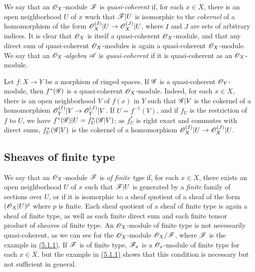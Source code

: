 \begin{env}[5.1.3]
\label{env-0.5.1.3}
We say that an $\mathscr{O}_X$-module $\mathscr{F}$ is {\em quasi-coherent} if, for each $x\in X$, there
is an open neighborhood $U$ of $x$ wuch that $\mathscr{F}|U$ is isomorphic to the {\em cokernel}
of a homomorphism of the form $\mathscr{O}_X^{(I)}|U\to\mathscr{O}_X^{(J)}|U$, where $I$ and $J$ are sets of
arbitrary indices. It is clear that $\mathscr{O}_X$ is itself a quasi-coherent $\mathscr{O}_X$-module, and
that any direct sum of quasi-coherent $\mathscr{O}_X$-modules is again a quasi-coherent
$\mathscr{O}_X$-module. We say that an {\em $\mathscr{O}_X$-algebra $\mathscr{A}$} is {\em quasi-coherent} if
it is quasi-coherent as an $\mathscr{O}_X$-module.
\end{env}

\begin{env}[5.1.4]
\label{env-0.5.1.4}
Let $f:X\to Y$ be a morphism of ringed spaces. If $\mathscr{G}$ is a quasi-coherent
$\mathscr{O}_Y$-module, then $f^*(\mathscr{G})$ is a quasi-coherent $\mathscr{O}_X$-module. Indeed, for each
$x\in X$, there is an open neighborhood $V$ of $f(x)$ in $Y$ such that $\mathscr{G}|V$ is the
cokernel of a homomorphism $\mathscr{O}_Y^{(I)}|V\to\mathscr{O}_Y^{(J)}|V$. If $U=f^{-1}(V)$, and if $f_U$ is
the restriction of $f$ to $U$, we have $f^*(\mathscr{G})|U=f_U^*(\mathscr{G}|V)$; as $f_U^*$ is right
exact and commutes with direct sums, $f_U^*(\mathscr{G}|V)$ is the cokernel of a homomorphism
$\mathscr{O}_X^{(I)}|U\to\mathscr{O}_X^{(J)}|U$.
\end{env}

\subsection{Sheaves of finite type}
\label{subsection-sheaves-of-finite-type}

\begin{env}[5.2.1]
\label{env-0.5.2.1}
We say that an $\mathscr{O}_X$-module $\mathscr{F}$ is {\em of finite type} if, for each $x\in X$, there
exists an open neighborhood $U$ of $x$ such that $\mathscr{F}|U$ is generated by a {\em finite}
family of sections over $U$, or if it is isomorphic to a sheaf quotient of a sheaf of the
form $(\mathscr{O}_X|U)^p$ where $p$ is finite. Each sheaf quotient of a sheaf of finite type is
again a sheaf of finite type, as well as each finite direct sum and each finite tensor
product of sheaves of finite type. An $\mathscr{O}_X$-module of finite type is not necessarily
quasi-coherent, as we can see for the $\mathscr{O}_X$-module $\mathscr{O}_X/\mathscr{F}$, where $\mathscr{F}$ is the
example in \hyperref[env-0.5.1.1]{(5.1.1)}. If $\mathscr{F}$ is of finite type, $\mathscr{F}_x$ is a $\mathscr{O}_x$-module
of finite type for each $x\in X$, but the example in \hyperref[env-0.5.1.1]{(5.1.1)} shows that this
condition is necessary but not sufficient in general.
\end{env}

